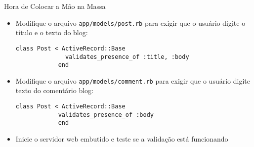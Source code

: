 \begin{frame}[t, fragile]{Hora de Colocar a Mão na Massa}
	\begin{itemize}
			
		\item Modifique o arquivo \verb|app/models/post.rb| para exigir 
			que o usuário digite o título e o texto do blog:
		\begin{lstlisting}[style=RubyInputStyle]
			class Post < ActiveRecord::Base
			  validates_presence_of :title, :body
			end
		\end{lstlisting}
		
		\item Modifique o arquivo \verb|app/models/comment.rb| para exigir 
		que o usuário digite texto do comentário blog:
		\begin{lstlisting}[style=RubyInputStyle]
			class Post < ActiveRecord::Base
		    validates_presence_of :body
			end
		\end{lstlisting}
		
		\item Inicie o servidor web embutido e teste se a validação está funcionando
					
	\end{itemize}
\end{frame}